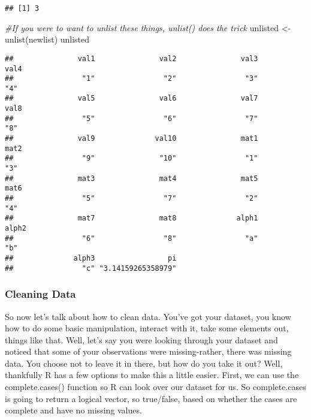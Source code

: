\documentclass[
]{article}
\newenvironment{Shaded}{\begin{snugshade}}{\end{snugshade}}
\newcommand{\CommentTok}[1]{\textcolor[rgb]{0.56,0.35,0.01}{\textit{#1}}}
\newcommand{\FunctionTok}[1]{\textcolor[rgb]{0.00,0.00,0.00}{#1}}
\newcommand{\NormalTok}[1]{#1}
\newcommand{\OtherTok}[1]{\textcolor[rgb]{0.56,0.35,0.01}{#1}}
\begin{document}
\begin{verbatim}
## [1] 3
\end{verbatim}

\begin{Shaded}
\begin{Highlighting}[]
\CommentTok{\#If you were to want to unlist these things, unlist() does the trick}
\NormalTok{unlisted }\OtherTok{\textless{}{-}} \FunctionTok{unlist}\NormalTok{(newlist)}
\NormalTok{unlisted}
\end{Highlighting}
\end{Shaded}

\begin{verbatim}
##               val1               val2               val3               val4 
##                "1"                "2"                "3"                "4" 
##               val5               val6               val7               val8 
##                "5"                "6"                "7"                "8" 
##               val9              val10               mat1               mat2 
##                "9"               "10"                "1"                "3" 
##               mat3               mat4               mat5               mat6 
##                "5"                "7"                "2"                "4" 
##               mat7               mat8              alph1              alph2 
##                "6"                "8"                "a"                "b" 
##              alph3                 pi 
##                "c" "3.14159265358979"
\end{verbatim}

\hypertarget{cleaning-data}{%
\subsubsection{Cleaning Data}\label{cleaning-data}}

So now let's talk about how to clean data. You've got your dataset, you
know how to do some basic manipulation, interact with it, take some
elements out, things like that. Well, let's say you were looking through
your dataset and noticed that some of your observations were
missing-rather, there was missing data. You choose not to leave it in
there, but how do you take it out? Well, thankfully R has a few options
to make this a little easier. First, we can use the complete.cases()
function so R can look over our dataset for us. So complete.cases is
going to return a logical vector, so true/false, based on whether the
cases are complete and have no missing values.
\end{document}
